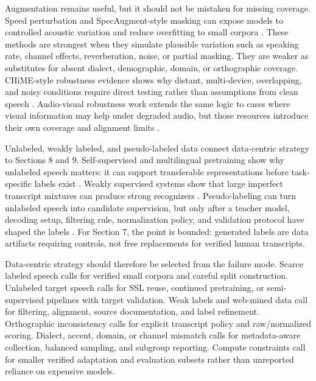 \documentclass[pdflatex,sn-basic]{sn-jnl}
\theoremstyle{thmstyleone}
\theoremstyle{thmstyletwo}
\theoremstyle{thmstylethree}
\begin{document}
Augmentation remains useful, but it should not be mistaken for missing coverage. Speed perturbation and SpecAugment-style masking can expose models to controlled acoustic variation and reduce overfitting to small corpora \citep{ko15_interspeech,park19e_interspeech}. These methods are strongest when they simulate plausible variation such as speaking rate, channel effects, reverberation, noise, or partial masking. They are weaker as substitutes for absent dialect, demographic, domain, or orthographic coverage. CHiME-style robustness evidence shows why distant, multi-device, overlapping, and noisy conditions require direct testing rather than assumptions from clean speech \citep{cornell2023chime7}. Audio-visual robustness work extends the same logic to cases where visual information may help under degraded audio, but those resources introduce their own coverage and alignment limits \citep{anwar23_interspeech}.

Unlabeled, weakly labeled, and pseudo-labeled data connect data-centric strategy to Sections 8 and 9. Self-supervised and multilingual pretraining show why unlabeled speech matters: it can support transferable representations before task-specific labels exist \citep{baevski2020wav2vec2,babu22_interspeech}. Weakly supervised systems show that large imperfect transcript mixtures can produce strong recognizers \citep{pmlr-v202-radford23a}. Pseudo-labeling can turn unlabeled speech into candidate supervision, but only after a teacher model, decoding setup, filtering rule, normalization policy, and validation protocol have shaped the labels \citep{park20d_interspeech,khurana2020dust,bhogale24_interspeech}. For Section 7, the point is bounded: generated labels are data artifacts requiring controls, not free replacements for verified human transcripts.

Data-centric strategy should therefore be selected from the failure mode. Scarce labeled speech calls for verified small corpora and careful split construction. Unlabeled target speech calls for SSL reuse, continued pretraining, or semi-supervised pipelines with target validation. Weak labels and web-mined data call for filtering, alignment, source documentation, and label refinement. Orthographic inconsistency calls for explicit transcript policy and raw/normalized scoring. Dialect, accent, domain, or channel mismatch calls for metadata-aware collection, balanced sampling, and subgroup reporting. Compute constraints call for smaller verified adaptation and evaluation subsets rather than unreported reliance on expensive models.
\end{document}

